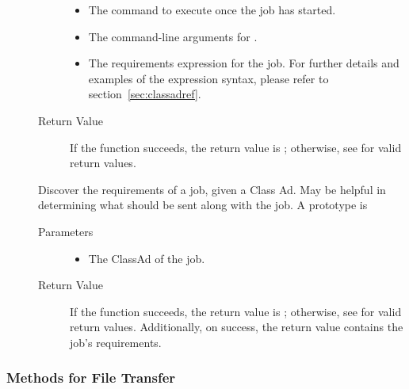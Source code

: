 \begin{description}
\begin{description}
\begin{itemize}
      
      \item {} 
      The command to execute once the job has started.
      \item {}
      The command-line arguments for .
      \item {}
      The requirements expression for the job. For further details 
      and examples of the expression syntax, please refer to 
      section~\ref{sec:classadref}.
    \end{itemize}
    \item[ Return Value]
      If the function succeeds, the return value is ; 
      otherwise, see  for valid return values. 
  \end{description}
 
\item [\Code{discoverJobRequirements}]
  Discover the requirements of a job, given a Class Ad.  May be helpful 
  in determining what should be sent along with the job. 
  A prototype is 


  \begin{description}
    \item[ Parameters]
    \begin{itemize}
      \item {} The ClassAd of the job.
    \end{itemize}
    \item[ Return Value]
      If the function succeeds, the return value is ; 
      otherwise, see  for valid return values. Additionally,
      on success, the return value contains the job's requirements.
  \end{description}    

\end{description}

\subsubsection{\label{WebService-FileTransfer} Methods for File Transfer}

